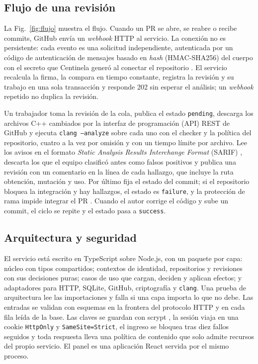 \documentclass[conference]{IEEEtran}
\newcommand{\code}[1]{\texttt{#1}}
\begin{document}
\subsection{Flujo de una revisión}
La Fig.~\ref{fig:flujo} muestra el flujo. Cuando un PR se abre, se reabre o recibe commits, GitHub envía un \textit{webhook} HTTP al servicio. La conexión no es persistente: cada evento es una solicitud independiente, autenticada por un código de autenticación de mensajes basado en \textit{hash} (HMAC-SHA256) \cite{rfc2104} del cuerpo con el secreto que Centinela generó al conectar el repositorio \cite{ghwebhook}. El servicio recalcula la firma, la compara en tiempo constante, registra la revisión y su trabajo en una sola transacción y responde 202 sin esperar el análisis; un \textit{webhook} repetido no duplica la revisión.

Un trabajador toma la revisión de la cola, publica el estado \code{pending}, descarga los archivos C++ cambiados por la interfaz de programación (API) REST de GitHub y ejecuta \code{clang --analyze} sobre cada uno con el checker y la política del repositorio, cuatro a la vez por omisión y con un tiempo límite por archivo. Lee los avisos en el formato \textit{Static Analysis Results Interchange Format} (SARIF) \cite{sarif}, descarta los que el equipo clasificó antes como falsos positivos y publica una revisión con un comentario en la línea de cada hallazgo, que incluye la ruta obtención, mutación y uso. Por último fija el estado del commit; si el repositorio bloquea la integración y hay hallazgos, el estado es \code{failure}, y la protección de rama impide integrar el PR \cite{ghprotected}. Cuando el autor corrige el código y sube un commit, el ciclo se repite y el estado pasa a \code{success}.

\subsection{Arquitectura y seguridad}
El servicio está escrito en TypeScript sobre Node.js, con un paquete por capa: núcleo con tipos compartidos; contextos de identidad, repositorios y revisiones con sus decisiones puras; casos de uso que cargan, deciden y aplican efectos; y adaptadores para HTTP, SQLite, GitHub, criptografía y \code{clang}. Una prueba de arquitectura lee las importaciones y falla si una capa importa lo que no debe. Las entradas se validan con esquemas en la frontera del protocolo HTTP y en cada fila leída de la base. Las claves se guardan con scrypt \cite{rfc7914}, la sesión viaja en una cookie \code{HttpOnly} y \code{SameSite=Strict}, el ingreso se bloquea tras diez fallos seguidos y toda respuesta lleva una política de contenido que solo admite recursos del propio servicio. El panel es una aplicación React servida por el mismo proceso.
\end{document}
